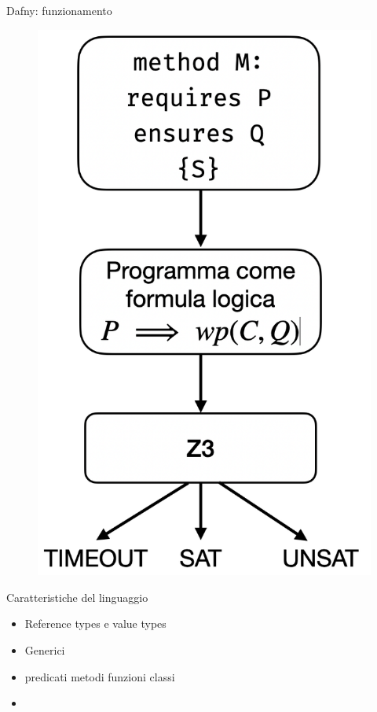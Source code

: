 \documentclass{beamer}
\begin{document}
\begin{frame}{Dafny: funzionamento}
{\begin{figure}
            \includegraphics[scale=0.4]{./assets/images/mechanism.png}
        \end{figure}
    }
\end{frame}

\begin{frame}{Caratteristiche del linguaggio}
    \begin{itemize}
        \item Reference types e value types
        \item Generici
        \item predicati metodi funzioni classi
        \item 
    \end{itemize}
\end{frame}
\end{document}
